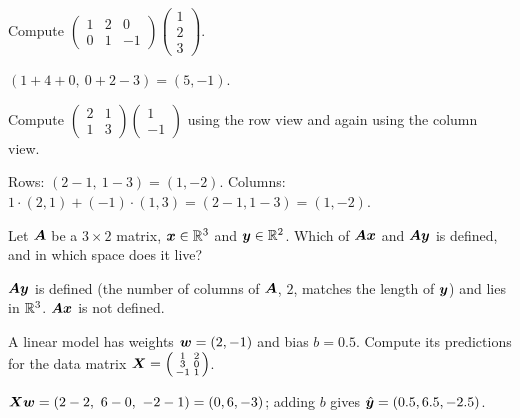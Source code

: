 \sectionexercises

\begin{exercise}
Compute
$\left(\begin{smallmatrix} 1 & 2 & 0\\ 0 & 1 & -1\end{smallmatrix}\right)
\left(\begin{smallmatrix} 1\\ 2\\ 3\end{smallmatrix}\right)$.
\end{exercise}
\begin{solution}
$(1 + 4 + 0,\ 0 + 2 - 3) = (5, -1)$.
\end{solution}

\begin{exercise}
Compute $\left(\begin{smallmatrix} 2 & 1\\ 1 & 3\end{smallmatrix}\right)
\left(\begin{smallmatrix} 1\\ -1\end{smallmatrix}\right)$ using the row view and
again using the column view.
\end{exercise}
\begin{solution}
Rows: $(2 - 1,\ 1 - 3) = (1, -2)$. Columns: $1\cdot(2, 1) + (-1)\cdot(1, 3) =
(2 - 1, 1 - 3) = (1, -2)$.
\end{solution}

\begin{exercise}
Let $\bm{A}$ be a $3\times2$ matrix, $\bm{x} \in \mathbb{R}^3$ and $\bm{y} \in \mathbb{R}^2$. Which of
$\bm{A}\bm{x}$ and $\bm{A}\bm{y}$ is defined, and in which space does it live?
\end{exercise}
\begin{solution}
$\bm{A}\bm{y}$ is defined (the number of columns of $\bm{A}$, $2$, matches the length of
$\bm{y}$) and lies in $\mathbb{R}^3$. $\bm{A}\bm{x}$ is not defined.
\end{solution}

\begin{exercise}
A linear model has weights $\bm{w} = (2, -1)$ and bias $b = 0.5$. Compute its
predictions for the data matrix
$\bm{X} = \left(\begin{smallmatrix} 1 & 2\\ 3 & 0\\ -1 & 1\end{smallmatrix}\right)$.
\end{exercise}
\begin{solution}
$\bm{X}\bm{w} = (2 - 2,\ 6 - 0,\ -2 - 1) = (0, 6, -3)$; adding $b$ gives
$\hat{\bm{y}} = (0.5, 6.5, -2.5)$.
\end{solution}

